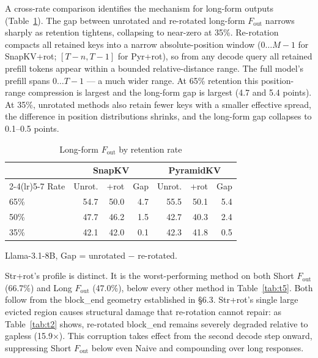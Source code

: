 \documentclass[10pt,letterpaper]{article}
\begin{document}
A cross-rate comparison identifies the mechanism for long-form outputs
(Table~\ref{tab:t7}). The gap between unrotated and re-rotated long-form
\(F_{\text{out}}\) narrows sharply as retention tightens, collapsing to
near-zero at 35\%. Re-rotation compacts all retained keys into a narrow
absolute-position window (\(0 \ldots M-1\) for SnapKV+rot;
\([T-n, T-1]\) for Pyr+rot), so from any decode query all retained
prefill tokens appear within a bounded relative-distance range. The full
model's prefill spans \(0 \ldots T-1\) --- a much wider range. At 65\%
retention this position-range compression is largest and the long-form
gap is largest (4.7 and 5.4 points). At 35\%, unrotated methods also
retain fewer keys with a smaller effective spread, the difference in
position distributions shrinks, and the long-form gap collapses to
0.1--0.5 points.
\begin{table}[H]
\centering
\small
\caption{Long-form \(F_{\text{out}}\) by retention rate}
\label{tab:t7}
\begin{tabular}{@{}lrrrrrr@{}}
\toprule
& \multicolumn{3}{c}{SnapKV} & \multicolumn{3}{c}{PyramidKV}\\
\cmidrule(lr){2-4}\cmidrule(lr){5-7}
Rate & Unrot. & +rot & Gap & Unrot. & +rot & Gap\\
\midrule
65\% & 54.7 & 50.0 & 4.7 & 55.5 & 50.1 & 5.4\\
50\% & 47.7 & 46.2 & 1.5 & 42.7 & 40.3 & 2.4\\
35\% & 42.1 & 42.0 & 0.1 & 42.3 & 41.8 & 0.5\\
\bottomrule
\end{tabular}
\center
Llama-3.1-8B, Gap = unrotated − re-rotated.
\end{table}

Str+rot's profile is distinct. It is the worst-performing
method on both Short \(F_{\text{out}}\) (66.7\%) and Long
\(F_{\text{out}}\) (47.0\%), below every other method in Table~\ref{tab:t5}. Both
follow from the block\_end geometry established in §6.3. Str+rot's
single large evicted region causes structural damage that re-rotation
cannot repair: as Table~\ref{tab:t2} shows, re-rotated block\_end remains severely
degraded relative to gapless (15.9×). This corruption takes effect from
the second decode step onward, suppressing Short \(F_{\text{out}}\)
below even Naive and compounding over long responses.
\end{document}
